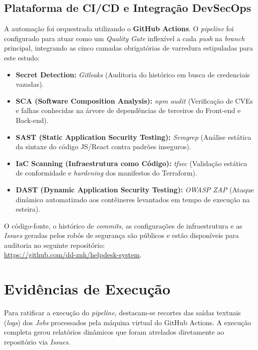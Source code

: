 \documentclass[12pt, a4paper]{article}
\begin{document}
\subsection{Plataforma de CI/CD e Integração DevSecOps}
A automação foi orquestrada utilizando o \textbf{GitHub Actions}. O \textit{pipeline} foi configurado para atuar como um \textit{Quality Gate} inflexível a cada \textit{push} na \textit{branch} principal, integrando as cinco camadas obrigatórias de varredura estipuladas para este estudo:

\begin{itemize}
    \item \textbf{Secret Detection:} \textit{Gitleaks} (Auditoria do histórico em busca de credenciais vazadas).
    \item \textbf{SCA (Software Composition Analysis):} \textit{npm audit} (Verificação de CVEs e falhas conhecidas na árvore de dependências de terceiros do Front-end e Back-end).
    \item \textbf{SAST (Static Application Security Testing):} \textit{Semgrep} (Análise estática da sintaxe do código JS/React contra padrões inseguros).
    \item \textbf{IaC Scanning (Infraestrutura como Código):} \textit{tfsec} (Validação estática de conformidade e \textit{hardening} dos manifestos do Terraform).
    \item \textbf{DAST (Dynamic Application Security Testing):} \textit{OWASP ZAP} (Ataque dinâmico automatizado aos contêineres levantados em tempo de execução na esteira).
\end{itemize}

O código-fonte, o histórico de \textit{commits}, as configurações de infraestrutura e as \textit{Issues} geradas pelos robôs de segurança são públicos e estão disponíveis para auditoria no seguinte repositório: \\ \url{https://github.com/dd-znh/helpdesk-system}.

\section{Evidências de Execução}

Para ratificar a execução do \textit{pipeline}, destacam-se recortes das saídas textuais (\textit{logs}) dos \textit{Jobs} processados pela máquina virtual do GitHub Actions. A execução completa gerou relatórios dinâmicos que foram atrelados diretamente ao repositório via \textit{Issues}.
\end{document}
